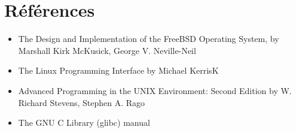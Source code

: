\section{Références}
\begin{itemize}
\item The  Design and Implementation of the FreeBSD Operating System, by Marshall Kirk McKusick, George V. Neville-Neil 
\item The Linux Programming Interface by Michael KerrisK
\item Advanced Programming in the UNIX Environment: Second Edition by W. Richard Stevens, Stephen A. Rago 
\item The GNU C Library (glibc) manual 
\end{itemize}